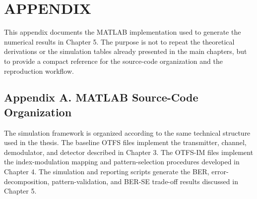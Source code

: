 \section*{APPENDIX}
{}
\setcounter{table}{0}
\setcounter{figure}{0}
\setcounter{equation}{0}
\renewcommand{\thetable}{A.\arabic{table}}
\renewcommand{\thefigure}{A.\arabic{figure}}
\renewcommand{\theequation}{A.\arabic{equation}}
\renewcommand{\theHtable}{A.\arabic{table}}
\renewcommand{\theHfigure}{A.\arabic{figure}}
\renewcommand{\theHequation}{A.\arabic{equation}}

This appendix documents the MATLAB implementation used to generate the numerical results in Chapter 5. The purpose is not to repeat the theoretical derivations or the simulation tables already presented in the main chapters, but to provide a compact reference for the source-code organization and the reproduction workflow.

\subsection*{Appendix A. MATLAB Source-Code Organization}

The simulation framework is organized according to the same technical structure used in the thesis. The baseline OTFS files implement the transmitter, channel, demodulator, and detector described in Chapter 3. The OTFS-IM files implement the index-modulation mapping and pattern-selection procedures developed in Chapter 4. The simulation and reporting scripts generate the BER, error-decomposition, pattern-validation, and BER-SE trade-off results discussed in Chapter 5.

